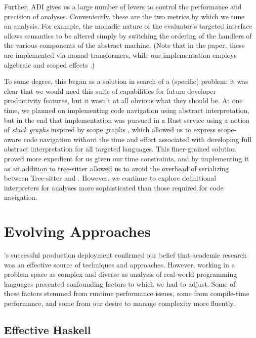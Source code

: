 \documentclass[acmsmall,fleqn]{acmart}
\begin{document}
Further, ADI gives us a large number of levers to control the performance and
precision of analyses. Conveniently, these are the two metrics by which we tune
an analysis. For example, the monadic nature of the evaluator's targeted
interface allows semantics to be altered simply by switching the ordering of the
handlers of the various components of the abstract machine. (Note that in the
paper, these are implemented via monad transformers, while our implementation
employs algebraic and scoped effects \cite{wu2014effect}.)

To some degree, this began as a solution in search of a (specific) problem: it
was clear that we would need this suite of capabilities for future developer
productivity features, but it wasn't at all obvious what they should be. At one
time, we planned on implementing code navigation using abstract interpretation,
but in the end that implementation was pursued in a Rust service using a notion
of \emph{stack graphs} \cite{creager21stackgraphs} inspired by scope graphs
\cite{visser18scopes}, which allowed us to express scope-aware code navigation
without the time and effort associated with developing full abstract
interpretation for all targeted languages. This finer-grained solution proved
more expedient for us given our time constraints, and by implementing it as an
addition to tree-sitter allowed us to avoid the overhead of serializing between
Tree-sitter and \semantic{}. However, we continue to explore definitional
interpreters for analyses more sophisticated than those required for code navigation.

\section{Evolving Approaches}
\label{sec:evolving}

\semantic's successful production deployment confirmed our belief that
academic research was an effective source of techniques and approaches. However,
working in a problem space as complex and diverse as analysis of real-world
programming languages presented confounding factors to which we had to adjust.
Some of these factors stemmed from runtime performance issues, some from
compile-time performance, and some from our desire to manage complexity more
fluently.

\subsection{Effective Haskell} \label{sec:effects}
\end{document}
